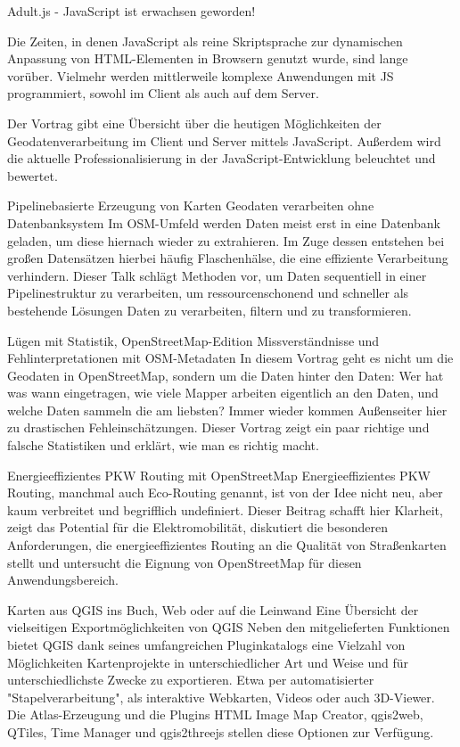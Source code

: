 \abstractZwei{ }%
{Adult.js - JavaScript ist erwachsen geworden!}%
{}%
{%
Die Zeiten, in denen JavaScript als reine Skriptsprache zur dynamischen Anpassung von HTML-Elementen in Browsern genutzt wurde, sind lange vorüber. Vielmehr werden mittlerweile komplexe Anwendungen mit JS programmiert, sowohl im Client als auch auf dem Server.

Der Vortrag gibt eine Übersicht über die heutigen Möglichkeiten der Geodatenverarbeitung im Client und Server mittels JavaScript. Außerdem wird die aktuelle Professionalisierung in der JavaScript-Entwicklung beleuchtet und bewertet.%
}

%
{Pipelinebasierte Erzeugung von Karten}%
{Geodaten verarbeiten ohne Datenbanksystem}%
{%
Im OSM-Umfeld werden Daten meist erst in eine Datenbank geladen, um diese hiernach wieder zu extrahieren. Im Zuge dessen entstehen bei großen Datensätzen hierbei häufig Flaschenhälse, die eine effiziente Verarbeitung verhindern. Dieser Talk schlägt Methoden vor, um Daten sequentiell in einer Pipelinestruktur zu verarbeiten, um ressourcenschonend und schneller als bestehende Lösungen Daten zu verarbeiten, filtern und zu transformieren.%
}


%
{Lügen mit Statistik, OpenStreetMap-Edition}%
{Missverständnisse und Fehlinterpretationen mit OSM-Metadaten}%
{%
In diesem Vortrag geht es nicht um die Geodaten in OpenStreetMap, sondern um die Daten hinter den Daten: Wer hat was wann eingetragen, wie viele Mapper arbeiten eigentlich an den Daten, und welche Daten sammeln die am liebsten? Immer wieder kommen Außenseiter hier zu drastischen Fehleinschätzungen. Dieser Vortrag zeigt ein paar richtige und falsche Statistiken und erklärt, wie man es richtig macht.%
}

%
{Energieeffizientes PKW Routing mit OpenStreetMap}%
{}%
{%
Energieeffizientes PKW Routing, manchmal auch Eco-Routing genannt, ist von der Idee nicht neu, aber kaum verbreitet und begrifflich undefiniert. Dieser Beitrag schafft hier Klarheit, zeigt das Potential für die Elektromobilität, diskutiert die besonderen Anforderungen, die energieeffizientes Routing an die Qualität von Straßenkarten stellt und untersucht die Eignung von OpenStreetMap für diesen Anwendungsbereich.%
}

%
{Karten aus QGIS ins Buch, Web oder auf die Leinwand}%
{Eine Übersicht der vielseitigen Exportmöglichkeiten von QGIS}%
{%
Neben den mitgelieferten Funktionen bietet QGIS dank seines umfangreichen Pluginkatalogs eine Vielzahl von Möglichkeiten Kartenprojekte in unterschiedlicher Art und Weise und für unterschiedlichste Zwecke zu exportieren. Etwa per automatisierter "Stapelverarbeitung", als interaktive Webkarten, Videos oder auch 3D-Viewer. Die Atlas-Erzeugung und die Plugins HTML Image Map Creator, qgis2web, QTiles, Time Manager und qgis2threejs stellen diese Optionen zur Verfügung.%
}

